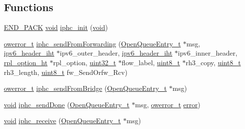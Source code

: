 \subsection*{Functions}
\begin{DoxyCompactItemize}
\item 
\hyperlink{toolchain__defs_8h_a6e6e74e14acee2db089b33d772e3265f}{E\+N\+D\+\_\+\+P\+A\+CK} \hyperlink{usb__devapi_8h_afabf60e7f57651d6d595a02c75f07cd0}{void} \hyperlink{group___i_p_h_c_ga4da058d78bdad75d1b51b80400008eb0}{iphc\+\_\+init} (\hyperlink{usb__devapi_8h_afabf60e7f57651d6d595a02c75f07cd0}{void})
\item 
\hyperlink{opendefs_8h_af20b7c3ed9d2ba19e56a309ad9314803}{owerror\+\_\+t} \hyperlink{group___i_p_h_c_gafb19e0869f28f4c906dc3d2dd1eed908}{iphc\+\_\+send\+From\+Forwarding} (\hyperlink{struct_open_queue_entry__t}{Open\+Queue\+Entry\+\_\+t} $\ast$msg, \hyperlink{structipv6__header__iht}{ipv6\+\_\+header\+\_\+iht} $\ast$ipv6\+\_\+outer\+\_\+header, \hyperlink{structipv6__header__iht}{ipv6\+\_\+header\+\_\+iht} $\ast$ipv6\+\_\+inner\+\_\+header, \hyperlink{structrpl__option__ht}{rpl\+\_\+option\+\_\+ht} $\ast$rpl\+\_\+option, \hyperlink{_p_e___types_8h_a33594304e786b158f3fb30289278f5af}{uint32\+\_\+t} $\ast$flow\+\_\+label, \hyperlink{_p_e___types_8h_aba7bc1797add20fe3efdf37ced1182c5}{uint8\+\_\+t} $\ast$rh3\+\_\+copy, \hyperlink{_p_e___types_8h_aba7bc1797add20fe3efdf37ced1182c5}{uint8\+\_\+t} rh3\+\_\+length, \hyperlink{_p_e___types_8h_aba7bc1797add20fe3efdf37ced1182c5}{uint8\+\_\+t} fw\+\_\+\+Send\+Orfw\+\_\+\+Rcv)
\item 
\hyperlink{opendefs_8h_af20b7c3ed9d2ba19e56a309ad9314803}{owerror\+\_\+t} \hyperlink{group___i_p_h_c_ga4d3398508cb6263929b37fc238c829f6}{iphc\+\_\+send\+From\+Bridge} (\hyperlink{struct_open_queue_entry__t}{Open\+Queue\+Entry\+\_\+t} $\ast$msg)
\item 
\hyperlink{usb__devapi_8h_afabf60e7f57651d6d595a02c75f07cd0}{void} \hyperlink{group___i_p_h_c_ga74c2778b882cbb1be841b5e31e8d27ee}{iphc\+\_\+send\+Done} (\hyperlink{struct_open_queue_entry__t}{Open\+Queue\+Entry\+\_\+t} $\ast$msg, \hyperlink{opendefs_8h_af20b7c3ed9d2ba19e56a309ad9314803}{owerror\+\_\+t} \hyperlink{disk_8c_ad018a3100b2dabad325a0800152db297}{error})
\item 
\hyperlink{usb__devapi_8h_afabf60e7f57651d6d595a02c75f07cd0}{void} \hyperlink{group___i_p_h_c_ga1d37923eb55e392d0a8a8e315a941e02}{iphc\+\_\+receive} (\hyperlink{struct_open_queue_entry__t}{Open\+Queue\+Entry\+\_\+t} $\ast$msg)
\item 

\end{DoxyCompactItemize}
